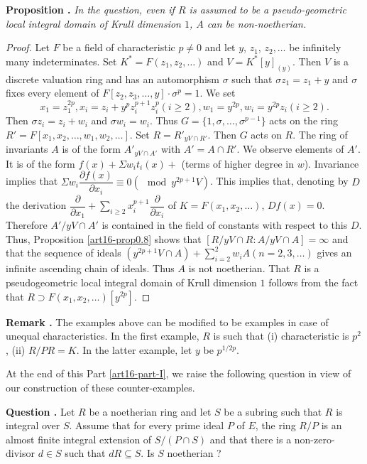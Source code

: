 \medskip
\noindent
{\bf Proposition .\label{art16-prop0.11}}
{\em In the question, even if $R$ is assumed to be a pseudo-geometric local integral domain of Krull dimension $1$, $A$ can be non-noetherian.}

\begin{proof}
Let $F$ be a field of characteristic $p\neq 0$ and let $y$, $z_{1}$, $z_{2},\ldots$ be infinitely many indeterminates. Set $K^{*}=F(z_{1},z_{2},\ldots)$ and $V=K^{*}[y]_{(y)}$. Then $V$ is a discrete valuation ring and has an automorphism $\sigma$ such that $\sigma z_{1}=z_{1}+y$ and $\sigma$ fixes every element of $F[z_{2},z_{3},\ldots,y]\cdot \sigma^{p}=1$. We set
$$
x_{1}=z^{2p}_{1},x_{i}=z_{i}+y^{p}z^{p+1}_{i}z^{p}_{i}(i\geq 2), w_{1}=y^{2p},w_{i}=y^{2p}z_{i}(i\geq 2).
$$\pageoriginale
Then $\sigma z_{i}=z_{i}+w_{i}$ and $\sigma w_{i}=w_{i}$. Thus $G=\{1,\sigma,\ldots,\sigma^{p-1}\}$ acts on the ring $R'=F[x_{1},x_{2},\ldots,w_{1},w_{2},\ldots]$. Set $R=R'_{y V\cap R'}$. Then $G$ acts on $R$. The ring of invariants $A$ is of the form $A'_{yV\cap A'}$ with $A'=A\cap R'$. We observe elements of $A'$. It is of the form $f(x)+\Sigma w_{i}t_{i}(x)+$ (terms of higher degree in $w$). Invariance implies that $\Sigma w_{i}\dfrac{\partial f(x)}{\partial x_{i}}\equiv 0(\mod y^{2p+1}V)$. This implies that, denoting by $D$ the derivation $\dfrac{\partial}{\partial x_{1}}+\sum\limits_{i\geq 2} x^{p+1}_{i}\dfrac{\partial}{\partial x_{i}}$ of $K=F(x_{1},x_{2},\ldots)$, $Df(x)=0$. Therefore $A'/yV\cap A'$ is contained in the field of constants with respect to this $D$. Thus, Proposition \ref{art16-prop0.8} shows that $[R/y V\cap R: A/yV\cap A]=\infty$ and that the sequence of ideals $(y^{2p+1}V\cap A)+\sum\limits^{2}_{i=2}w_{i}A(n=2,3,\ldots)$ gives an infinite ascending chain of ideals. Thus $A$ is not noetherian. That $R$ is a pseudogeometric local integral domain of Krull dimension $1$ follows from the fact that $R\supset F(x_{1},x_{2},\ldots)[y^{2p}]$.
\end{proof}

\medskip
\noindent
{\bf Remark .\label{art16-rem0.12}}
The examples above can be modified to be examples in case of unequal characteristics. In the first example, $R$ is such that (i) characteristic is $p^{2}$, (ii) $R/PR=K$. In the latter example, let $y$ be $p^{1/2p}$.
\smallskip

At the end of this Part \ref{art16-part-I}, we raise the following question in view of our construction of these counter-examples.

\medskip
\noindent
{\bf Question .\label{art16-ques0.13}}
Let $R$ be a noetherian ring and let $S$ be a subring such that $R$ is integral over $S$. Assume that for every prime ideal $P$ of $E$, the ring $R/P$ is an almost finite integral extension of $S/(P\cap S)$ and that there is a non-zero-divisor $d\in S$ such that $dR\subseteq S$. Is $S$ noetherian ?
\smallskip

